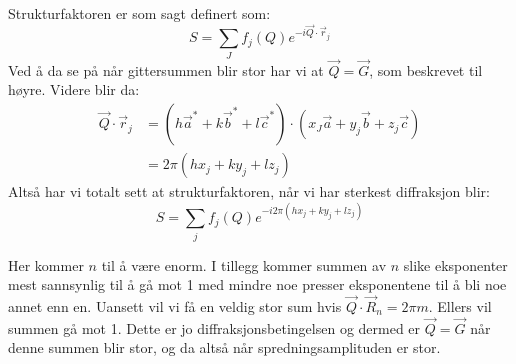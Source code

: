 \documentclass{article}
\begin{document}
\begin{minipage}{0.45\textwidth}
Strukturfaktoren er som sagt definert som: \begin{equation*}
    S = \sum_J f_j (Q) e^{-i \vec{Q} \cdot \vec{r}_j}
\end{equation*}
Ved å da se på når gittersummen blir stor har vi at $\vec{Q} = \vec{G}$, som beskrevet til høyre. Videre blir da:
\begin{align*}
    \vec{Q} \cdot \vec{r}_j &= (h \vec{a}^{*} + k \vec{b}^{*} + l \vec{c}^{*}) \cdot(x_J \vec{a} + y_j \vec{b} + z_j \vec{c}) \\
    &= 2 \pi (h x_j + ky_j + lz_j)
\end{align*}
Altså har vi totalt sett at strukturfaktoren, når vi har sterkest diffraksjon blir:
\begin{equation}
\label{eq:strukturfaktoren}
    \boxed{S = \sum_j f_j(Q) e^{-i 2 \pi (h x_j + ky_j + lz_j)}}
\end{equation}
\end{minipage}
\hfill
\begin{minipage}{0.45\textwidth}
Her kommer $n$ til å være enorm. I tillegg kommer summen av $n$ slike eksponenter mest sannsynlig til å gå mot 1 med mindre noe presser eksponentene til å bli noe annet enn en. Uansett vil vi få en veldig stor sum hvis $\vec{Q} \cdot \vec{R}_n = 2 \pi m$. Ellers vil summen gå mot 1. Dette er jo diffraksjonsbetingelsen og dermed er $\vec{Q} = \vec{G}$ når denne summen blir stor, og da altså når spredningsamplituden er stor.
\end{minipage}
\end{document}
